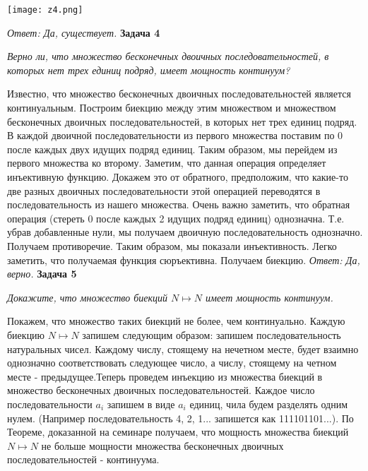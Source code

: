 \documentclass{article}
\begin{document}
\begin{center}
 \texttt{[image: z4.png]}
\end{center}
\noindent \textit{Ответ: Да, существует.}
\newline
\newline
 \noindent \textbf{Задача 4}
\begin{center}
\textit{Верно ли, что множество бесконечных двоичных последовательностей, в которых нет трех единиц подряд, имеет мощность континуум?}
\end{center}
Известно, что множество бесконечных двоичных последовательностей является континуальным. Построим биекцию между этим множеством и множеством бесконечных двоичных последовательностей, в которых нет трех единиц подряд. В каждой двоичной последовательности из первого множества поставим по 0 после каждых двух идущих подряд единиц. Таким образом, мы перейдем из первого множества ко второму. Заметим, что данная операция определяет инъективную функцию. Докажем это от обратного, предположим, что какие-то две разных двоичных последовательности этой операцией переводятся в последовательность из нашего множества. Очень важно заметить, что обратная операция (стереть 0 после каждых 2 идущих подряд единиц) однозначна. Т.е. убрав добавленные нули, мы получаем двоичную последовательность однозначно. Получаем противоречие. Таким образом, мы показали инъективность. Легко заметить, что получаемая функция сюръективна. Получаем биекцию.
\newline
\noindent \textit{Ответ: Да, верно.}
\newline \newline
 \noindent \textbf{Задача 5}
\begin{center}
\textit{Докажите, что множество биекций $N\mapsto N$ имеет мощность континуум.} 
\end{center}
Покажем, что множество таких биекций не более, чем континуально. Каждую биекцию $N\mapsto N$ запишем следующим образом: запишем последовательность натуральных чисел. Каждому числу, стоящему на нечетном месте, будет взаимно однозначно соответствовать следующее число, а числу, стоящему на четном месте - предыдущее.Теперь проведем инъекцию из множества биекций в множество бесконечных двоичных последовательностей. Каждое число последовательности $a_i$ запишем в виде $a_i$ единиц, чила будем разделять одним нулем. (Например последовательность 4, 2, 1... запишется как 111101101...). По Теореме, доказанной на семинаре получаем, что мощность множества биекций $N \mapsto N$ не больше мощности множества бесконечных двоичных последовательностей - континуума. 
\end{document}
